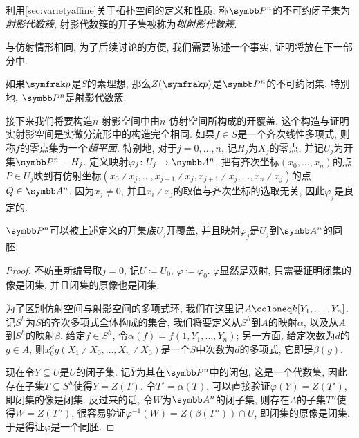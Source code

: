 利用\ref{sec:varietyaffine}关于拓扑空间的定义和性质, 称$\PP^n$的不可约闭子集为\emph{射影代数簇}, 射影代数簇的开子集被称为\emph{拟射影代数簇}.

与仿射情形相同, 为了后续讨论的方便, 我们需要陈述一个事实, 证明将放在下一部分中.

\begin{proposition}\label{prop:projectiveprimeirreducible}
    如果$\ideal{p}$是$S$的素理想, 那么$Z(\ideal{p})$是$\PP^n$的不可约闭集. 特别地, $\PP^n$是射影代数簇.
\end{proposition}

接下来我们将要构造$n$-射影空间中由$n$-仿射空间所构成的开覆盖, 这个构造与证明实射影空间是实微分流形中的构造\parencite[4--5, Definition 2.4]{flaherty_riemannian_1992}完全相同. 如果$f\in S$是一个齐次线性多项式, 则称$f$的零点集为一个\emph{超平面}. 特别地, 对于$j=0, \dotsc, n$, 记$H_j$为$X_j$的零点, 并记$U_j$为开集$\PP^n-H_j$. 定义映射$\varphi_j\colon U_j\to \AF^n$, 把有齐次坐标$(x_0, \dotsc, x_n)$的点$P\in U_j$映到有仿射坐标$(x_0{\divslash}x_j, \dotsc, x_{j-1}{\divslash}x_j, x_{j+1}{\divslash}x_j, \dotsc,  x_n{\divslash}x_j)$的点$Q\in \AF^n$. 因为$x_j\neq 0$, 并且$x_i{\divslash}x_j$的取值与齐次坐标的选取无关, 因此$\varphi_j$是良定的.

\begin{proposition}\label{prop:projspaceopencoverhomeo}
    $\PP^n$可以被上述定义的开集族$U_j$开覆盖, 并且映射$\varphi_j$是$U_j$到$\AF^n$的同胚.
\end{proposition}

\begin{proof}
    不妨重新编号取$j=0$, 记$U\coloneq U_0$, $\varphi\coloneq \varphi_0$. $\varphi$显然是双射, 只需要证明闭集的像是闭集, 并且闭集的原像也是闭集.

    为了区别仿射空间与射影空间的多项式环, 我们在这里记$A\coloneq \kk [Y_1, \dotsc, Y_n]$. 记$S^h$为$S$的齐次多项式全体构成的集合, 我们将要定义从$S^h$到$A$的映射$\alpha$, 以及从$A$到$S^h$的映射$\beta$. 给定$f\in S^h$, 令$\alpha(f)=f(1, Y_1, \dotsc, Y_n)$; 另一方面, 给定次数为$d$的$g\in A$, 则$x_0^dg(X_1{\divslash}X_0, \dotsc, X_n{\divslash}X_0)$是一个$S$中次数为$d$的多项式, 它即是$\beta(g)$.

    现在令$Y\subseteq U$是$U$的闭子集. 记$\overline{Y}$为其在$\PP^n$中的闭包, 这是一个代数集, 因此存在子集$T\subseteq S^h$使得$\overline{Y}=Z(T)$. 令$T'=\alpha(T)$, 可以直接验证$\varphi(Y)=Z(T')$, 即闭集的像是闭集. 反过来的话, 令$W$为$\AF^n$的闭子集, 则存在$A$的子集$T''$使得$W=Z(T'')$, 很容易验证$\varphi^{-1}(W) = Z(\beta(T''))\cap U$, 即闭集的原像是闭集. 于是得证$\varphi$是一个同胚.
\end{proof}

